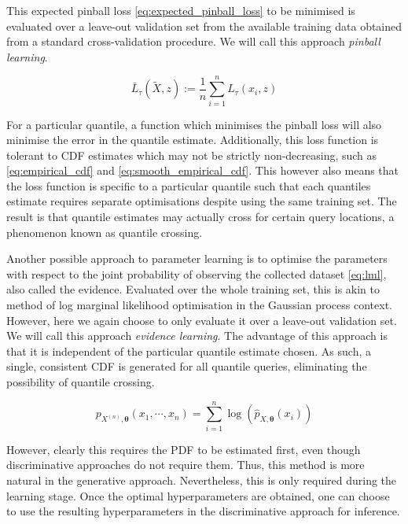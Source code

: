 \documentclass[twoside]{article} \usepackage{aistats2017}
\theoremstyle{definition}
\newcommand{\rv}[1]{{#1}}
\newcommand{\ds}[1]{\tilde{#1}}
\begin{document}
	This expected pinball loss \eqref{eq:expected_pinball_loss} to be minimised is evaluated over a leave-out validation set from the available training data obtained from a standard cross-validation procedure. We will call this approach \textit{pinball learning}.
	
	\begin{equation}
		\bar{L}_{\tau}(\ds{X}, z) := \frac{1}{n} \sum_{i = 1}^{n} L_{\tau}(x_{i}, z)
	\label{eq:expected_pinball_loss}
	\end{equation}
	
	For a particular quantile, a function which minimises the pinball loss will also minimise the
	error in the quantile estimate. Additionally, this loss function is tolerant to CDF estimates which may not be strictly non-decreasing, such as \eqref{eq:empirical_cdf} and \eqref{eq:smooth_empirical_cdf}. This however also means that the loss function is specific to a particular quantile such that each quantiles estimate requires separate optimisations despite using the same training set. The result is that quantile estimates may actually cross for certain query locations, a phenomenon known as quantile crossing.
	
	Another possible approach to parameter learning is to optimise the parameters with respect to the joint probability of observing the collected dataset \eqref{eq:lml}, also called the evidence. Evaluated over the whole training set, this is akin to method of log marginal likelihood optimisation in the Gaussian process context. However, here we again choose to only evaluate it over a leave-out validation set. We will call this approach \textit{evidence learning}. The advantage of this approach is that it is independent of the particular quantile estimate chosen. As such, a single, consistent CDF is generated for all quantile queries, eliminating the possibility of quantile crossing. 
	
	\begin{equation}
		p_{\rv{X}^{(n)}, \bm{\theta}}(x_{1}, \cdots, x_{n}) = \sum_{i = 1}^{n} \log(\hat{p}_{\rv{X}, \bm{\theta}}(x_{i}))
	\label{eq:lml}
	\end{equation}
	
	However, clearly this requires the PDF to be estimated first, even though discriminative approaches do not require them. Thus, this method is more natural in the generative approach. Nevertheless, this is only required during the learning stage. Once the optimal hyperparameters are obtained, one can choose to use the resulting hyperparameters in the discriminative approach for inference.
	
\end{document}
